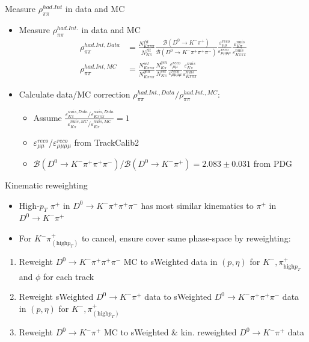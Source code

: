 \documentclass[xcolor={dvipsnames}]{beamer}
\def\pip    {{\ensuremath{\pi^+}}\xspace}
\def\pim    {{\ensuremath{\pi^-}}\xspace}
\def\Km     {{\ensuremath{K^-}}\xspace}
\def\Dz     {{\ensuremath{D^0}}\xspace}
\def\DKpi   {\ensuremath{\Dz \rightarrow \Km \pip}\xspace}
\def\DKpipipi   {\ensuremath{\Dz \rightarrow \Km \pip \pip \pim}\xspace}
\begin{document}
\begin{frame}{Measure $\rho^{had.Int}_{\pi\pi}$ in data and MC}
  \begin{itemize}
    \setlength\itemsep{1.2em}
    \item{Measure $\rho_{\pi\pi}^{had.Int.}$ in data and MC}
    \begin{equation*}
      \begin{split}
        \rho_{\pi\pi}^{had.Int,Data} &= \frac{N_{K\pi\pi\pi}^{fit}}{N_{K\pi}^{fit}} \frac{\mathcal{B}(D^0\to K^-\pi^+)}{\mathcal{B}(D^0\to K^-\pi^+\pi^+\pi^-)}\frac{\varepsilon_{\mu\mu}^{reco}}{\varepsilon_{\mu\mu\mu\mu}^{reco}}\frac{\varepsilon_{K\pi}^{nuis}}{\varepsilon_{K\pi\pi\pi}^{nuis}}\\
        \rho_{\pi\pi}^{had.Int,MC} &= \frac{N_{K\pi\pi\pi}^{sel}}{N_{K\pi\pi\pi}^{gen}}\frac{N_{K\pi}^{gen}}{N_{K\pi}^{sel}}\frac{\varepsilon_{\mu\mu}^{reco}}{\varepsilon_{\mu\mu\mu\mu}^{reco}}\frac{\varepsilon_{K\pi}^{nuis}}{\varepsilon_{K\pi\pi\pi}^{nuis}}
      \end{split}
    \end{equation*}
  \item{Calculate data/MC correction $\rho_{\pi\pi}^{had.Int.,Data}/\rho_{\pi\pi}^{had.Int.,MC}$:}
  \begin{itemize}
    \setlength\itemsep{0.8em}
    \item[-]{Assume $\frac{\varepsilon^{nuis,Data}_{K\pi}/\varepsilon^{nuis,Data}_{K\pi\pi\pi}}{\varepsilon^{nuis,MC}_{K\pi}/\varepsilon^{nuis,MC}_{K\pi}} = 1$}
    \item[-]{$\varepsilon_{\mu\mu}^{reco}$/$\varepsilon_{\mu\mu\mu\mu}^{reco}$ from TrackCalib2}
    \item[-]{$\mathcal{B}(D^0\to K^-\pi^+\pi^+\pi^-)/\mathcal{B}(D^0\to K^-\pi^+) = 2.083\pm0.031$ from PDG}
    \end{itemize}
  \end{itemize}
\end{frame}

\begin{frame}{Kinematic reweighting}
  \begin{itemize}
    \item{High-$p_T$ \pip in \DKpipipi has most similar kinematics to \pip in \DKpi}
    \item{For $K^- \pi^+_{(\text{high} p_T)}$ to cancel, ensure cover same phase-space by reweighting:}
  \end{itemize}
  \vspace{0.6cm}
  \begin{enumerate}
    \item{Reweight \DKpipipi MC to sWeighted data in $(p,\eta)$ for $K^-,\pi^+_{\text{high} p_T}$ and $\phi$ for each track}
    \item{Reweight sWeighted \DKpi data to sWeighted \DKpipipi data in $(p,\eta)$ for $K^-,\pi^+_{(\text{high} p_T)}$}
    \item{Reweight \DKpi MC to sWeighted \& kin. reweighted \DKpi data}
  \end{enumerate}
\end{frame}
\end{document}
